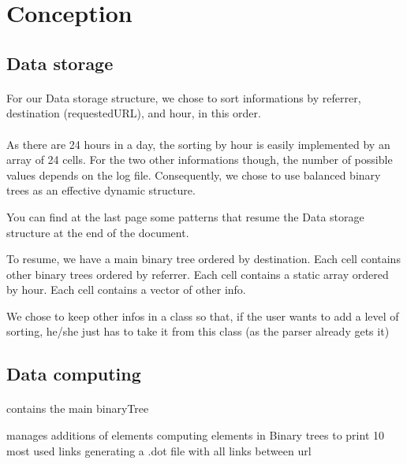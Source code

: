 \documentclass[a4paper, 12pts]{article}
\begin{document}
\newpage
 
\section{Conception}
\subsection{Data storage}
\paragraph{}
For our Data storage structure, we chose to sort informations by referrer, destination (requestedURL), and hour, in this order.
\paragraph{}
As there are 24 hours in a day, the sorting by hour is easily implemented by an array of 24 cells. For the two other informations though, the number of possible values depends on the log file. Consequently, we chose to use balanced binary trees as an effective dynamic structure.

You can find at the last page some patterns that resume the Data storage structure at the end of the document.

To resume, we have a main binary tree ordered by destination. Each cell contains other binary trees ordered by referrer. Each cell contains a static array ordered by hour. Each cell contains a vector of other info.

We chose to keep other infos in a class so that, if the user wants to add a level of sorting, he/she just has to take it from this class (as the parser already gets it)
\subsection{Data computing}
\paragraph{}
 contains the main binaryTree

 manages additions of elements
 computing elements in Binary trees to print 10 most used links
 generating a .dot file with all links between url

\newpage

%
\end{document}
